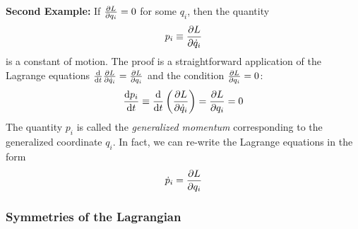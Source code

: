 \documentclass[11pt, a4paper]{article}
\begin{document}
\begin{itemize}
	\textbf{Second Example:} If $ \pdv{L}{q_i} = 0 $ for some $ q_i $, then the quantity
	\begin{equation*}
		p_i \equiv \pdv{L}{\dot{q}_i}
	\end{equation*}
	is a constant of motion. The proof is a straightforward application of the Lagrange equations $ \dv{}{t} \pdv{L}{\dot{q}_i} = \pdv{L}{q_i} $ and the condition $ \pdv{L}{q_i} = 0 $:
	\begin{equation*}
		\dv{p_i}{t} \equiv \dv{}{t} \left(\pdv{L}{\dot{q}_i}\right) = \pdv{L}{q_i} = 0 
	\end{equation*}
	The quantity $ p_{i} $ is called the \textit{generalized momentum} corresponding to the generalized coordinate $ q_{i} $. In fact, we can re-write the Lagrange equations in the form
	\begin{equation*}
		\dot{p}_{i} = \pdv{L}{q_{i}}
	\end{equation*}
	 
\end{itemize}


\subsubsection{Symmetries of the Lagrangian}
\end{document}
